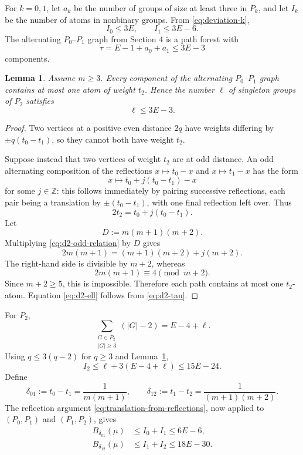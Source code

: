 \documentclass[11pt]{article}
\newtheorem{lemma}[theorem]{Lemma}
\theoremstyle{definition}
\newcommand{\Z}{\mathbb{Z}}
\newcommand{\1}{\mathbf{1}}
\begin{document}
For $k=0,1$, let $a_k$ be the number of groups of size at least three in $P_k$, and let $I_k$ be the number of atoms in nonbinary groups.  From \eqref{eq:deviation-k},
\begin{equation}\label{eq:d2-I01}
  I_0\le3E,
  \qquad
  I_1\le3E-6.
\end{equation}
The alternating $P_0$--$P_1$ graph from Section 4 is a path forest with
\begin{equation}\label{eq:d2-tau}
  \tau=E-1+a_0+a_1\le3E-3
\end{equation}
components.

\begin{lemma}\label{lem:d2-one-singleton}
Assume $m\ge3$.  Every component of the alternating $P_0$--$P_1$ graph contains at most one atom of weight $t_2$.  Hence the number $\ell$ of singleton groups of $P_2$ satisfies
\begin{equation}\label{eq:d2-ell}
  \ell\le3E-3.
\end{equation}
\end{lemma}

\begin{proof}
Two vertices at a positive even distance $2q$ have weights differing by $\pm q(t_0-t_1)$, so they cannot both have weight $t_2$.

Suppose instead that two vertices of weight $t_2$ are at odd distance.  An odd alternating composition of the reflections $x\mapsto t_0-x$ and $x\mapsto t_1-x$ has the form
\[
  x\longmapsto t_0+j(t_0-t_1)-x
\]
for some $j\in\Z$: this follows immediately by pairing successive reflections, each pair being a translation by $\pm(t_0-t_1)$, with one final reflection left over.  Thus
\begin{equation}\label{eq:d2-odd-relation}
  2t_2=t_0+j(t_0-t_1).
\end{equation}
Let
\[
  D:=m(m+1)(m+2).
\]
Multiplying \eqref{eq:d2-odd-relation} by $D$ gives
\[
  2m(m+1)=(m+1)(m+2)+j(m+2).
\]
The right-hand side is divisible by $m+2$, whereas
\[
  2m(m+1)\equiv4\pmod{m+2}.
\]
Since $m+2\ge5$, this is impossible.  Therefore each path contains at most one $t_2$-atom.  Equation \eqref{eq:d2-ell} follows from \eqref{eq:d2-tau}.
\end{proof}

For $P_2$,
\[
  \sum_{\substack{G\in P_2\\|G|\ge3}}(|G|-2)=E-4+\ell.
\]
Using $q\le3(q-2)$ for $q\ge3$ and Lemma~\ref{lem:d2-one-singleton},
\begin{equation}\label{eq:d2-I2}
  I_2
  \le\ell+3(E-4+\ell)
  \le15E-24.
\end{equation}
Define
\begin{equation}\label{eq:d2-deltas}
  \delta_{01}:=t_0-t_1=\frac1{m(m+1)},
  \qquad
  \delta_{12}:=t_1-t_2=\frac1{(m+1)(m+2)}.
\end{equation}
The reflection argument \eqref{eq:translation-from-reflections}, now applied to $(P_0,P_1)$ and $(P_1,P_2)$, gives
\begin{align}
  B_{\delta_{01}}(\mu)&\le I_0+I_1\le6E-6,\label{eq:d2-B01}\\
  B_{\delta_{12}}(\mu)&\le I_1+I_2\le18E-30.\label{eq:d2-B12}
\end{align}
\end{document}
